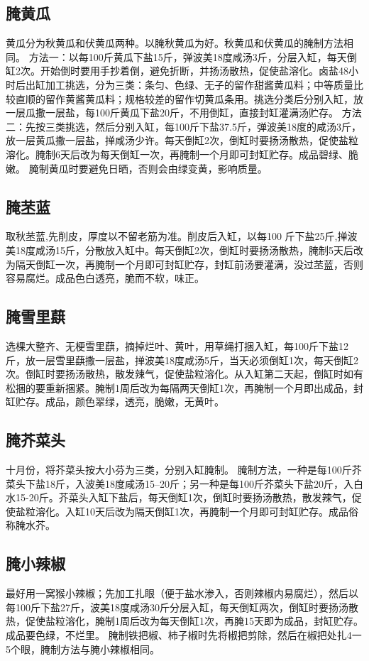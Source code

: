 \documentclass{ctexbook}
\begin{document}
\subsection{腌黄瓜}
黄瓜分为秋黄瓜和伏黄瓜两种。以腌秋黄瓜为好。秋黄瓜和伏黄瓜的腌制方法相同。
方法一：以每100斤黄瓜下盐15斤，弹波美18度咸汤3斤，分层入缸，每天倒缸2次。开始倒时要用手抄着倒，避免折断，并扬汤散热，促使盐溶化。卤盐48小时后出缸加工挑选，分为三类：条匀、色绿、无子的留作甜酱黄瓜料；中等质量比较直顺的留作黄酱黄瓜料；规格较差的留作切黄瓜条用。挑选分类后分别入缸，放一层瓜撒一层盐，每100斤黄瓜下盐20斤，不用倒缸，直接封缸灌满汤贮存。
方法二：先按三类挑选，然后分别入缸，每100斤下盐37.5斤，弹波美18度的咸汤3斤，放一层黄瓜撒一层盐，掸咸汤少许。每天倒缸2次，倒缸时要扬汤散热，促使盐粒溶化。腌制6天后改为每天倒缸一次，再腌制一个月即可封缸贮存。成品碧绿、脆嫩。
腌制黄瓜时要避免日晒，否则会由绿变黄，影响质量。
\subsection{腌苤蓝}
取秋苤蓝,先削皮，厚度以不留老筋为准。削皮后入缸，以每100
斤下盐25斤,掸波美18度咸汤15斤，分散放入缸中。每天倒缸2次，倒缸时要扬汤散热，腌制5天后改为隔天倒缸一次，再腌制一个月即可封缸贮存，封缸前汤要灌满，没过苤蓝，否则容易腐烂。成品色白透亮，脆而不软，味正。
\subsection{腌雪里蕻}
选棵大整齐、无梗雪里蕻，摘掉烂叶、黄叶，用草绳打捆入缸，每100斤下盐12斤，放一层雪里蕻撒一层盐，掸波美18度咸汤5斤，当天必须倒缸1次，每天倒缸2次。倒缸时要扬汤散热，散发辣气，促使盐粒溶化。从入缸第二天起，倒缸时如有松捆的要重新捆紧。腌制1周后改为每隔两天倒缸1次，再腌制一个月即出成品，封缸贮存。成品，颜色翠绿，透亮，脆嫩，无黄叶。
\subsection{腌芥菜头}
十月份，将芥菜头按大小芬为三类，分别入缸腌制。
腌制方法，一种是每100斤芥菜头下盐18斤，入波美18度咸汤15--20斤；另一种是每100斤芥菜头下盐20斤，入白水15-20斤。芥菜头入缸下盐后，每天倒缸1次，倒缸时要扬汤散热，散发辣气，促使盐粒溶化。入缸10天后改为隔天倒缸1次，再腌制一个月即可封缸贮存。成品俗称腌水芥。
\subsection{腌小辣椒}
最好用一窝猴小辣椒；先加工扎眼（便于盐水渗入，否则辣椒内易腐烂），然后以每100斤下盐27斤，波美18度咸汤30斤分层入缸，每天倒缸两次，倒缸时要扬汤散热，促使盐粒溶化，腌制1周后改为每天倒缸1次，再腌15天即为成品，封缸贮存。成品要色绿，不烂里。
腌制铁把椒、柿子椒时先将椒把剪除，然后在椒把处扎4一5个眼，腌制方法与腌小辣椒相同。
\end{document}
